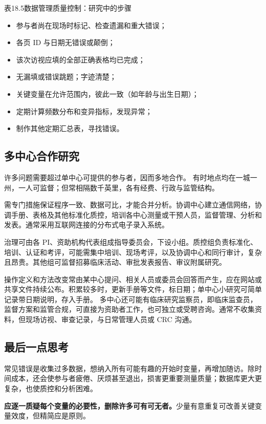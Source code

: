 \begin{bookbox}{表18.5\quad 数据管理质量控制：研究中的步骤}
\begin{itemize}
\item 参与者尚在现场时标记、检查遗漏和重大错误；
\item 各页 ID 与日期无错误或颠倒；
\item 该次访视应填的全部正确表格均已完成；
\item 无漏填或错误跳题；字迹清楚；
\item 关键变量在允许范围内，彼此一致（如年龄与出生日期）；
\item 定期计算频数分布和变异指标，发现异常；
\item 制作其他定期汇总表，寻找错误。
\end{itemize}
\end{bookbox}

\subsection{多中心合作研究}
许多问题需要超过单中心可提供的参与者，因而多地合作。
有时地点均在一城一州，一人可监督；但常相隔数千英里，各有经费、行政与监管结构。

需专门措施保证程序一致、数据可比，才能合并分析。协调中心建立通信网络，协调手册、表格及其他标准化质控，培训各中心测量或干预人员，监督管理、分析和发表。通常采用互联网连接的分布式电子录入系统。

治理可由各 PI、资助机构代表组成指导委员会，下设小组。质控组负责标准化、培训、认证和考评，可能需集中培训、现场考评，以及协调中心和同行审计，复杂且昂贵。其他组可监督招募临床活动、审批发表报告、审议附属研究。

操作定义和方法改变常由某中心提问、相关人员或委员会回答而产生，应在网站或共享文件持续公布。积累较多时，更新手册等文件，标日期；单中心小研究可简单记录带日期说明，存入手册。
多中心还可能有临床研究监察员，即临床监查员，监督方案和监管合规，可直接为资助者工作，也可独立或受聘咨询。通常不收集资料，但现场访视、审查记录，与日常管理人员或 CRC 沟通。

\subsection{最后一点思考}
常见错误是收集过多数据，想纳入所有可能有趣的开始时变量，再增加随访。除时间成本，还会使参与者疲倦、厌烦甚至退出，损害更重要测量质量；数据库更大更复杂，也使质控和分析困难。

\textbf{应逐一质疑每个变量的必要性，删除许多可有可无者。}少量有意重复可改善关键变量效度，但精简应是原则。

